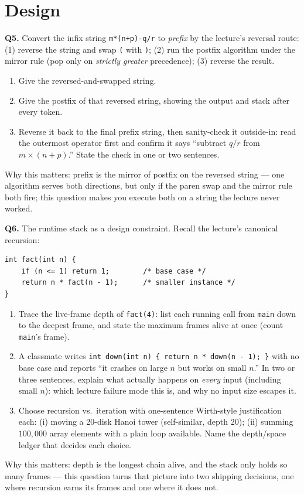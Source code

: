 \documentclass[11pt]{article}
\begin{document}
\section{Design}

\textbf{Q5.} Convert the infix string \texttt{m*(n+p)-q/r} to \emph{prefix} by the lecture's reversal route: (1) reverse the string and swap \texttt{(} with \texttt{)}; (2) run the postfix algorithm under the mirror rule (pop only on \emph{strictly greater} precedence); (3) reverse the result.
\begin{enumerate}
  \item[(a)] Give the reversed-and-swapped string.
  \item[(b)] Give the postfix of that reversed string, showing the output and stack after every token.
  \item[(c)] Reverse it back to the final prefix string, then sanity-check it outside-in: read the outermost operator first and confirm it says ``subtract $q/r$ from $m \times (n+p)$.'' State the check in one or two sentences.
\end{enumerate}
Why this matters: prefix is the mirror of postfix on the reversed string --- one algorithm serves both directions, but only if the paren swap and the mirror rule both fire; this question makes you execute both on a string the lecture never worked.

\textbf{Q6.} The runtime stack as a design constraint. Recall the lecture's canonical recursion:
\begin{verbatim}
int fact(int n) {
    if (n <= 1) return 1;        /* base case */
    return n * fact(n - 1);      /* smaller instance */
}
\end{verbatim}
\begin{enumerate}
  \item[(a)] Trace the live-frame depth of \texttt{fact(4)}: list each running call from \texttt{main} down to the deepest frame, and state the maximum frames alive at once (count \texttt{main}'s frame).
  \item[(b)] A classmate writes \texttt{int down(int n) \{ return n * down(n - 1); \}} with no base case and reports ``it crashes on large $n$ but works on small $n$.'' In two or three sentences, explain what actually happens on \emph{every} input (including small $n$): which lecture failure mode this is, and why no input size escapes it.
  \item[(c)] Choose recursion vs.\ iteration with one-sentence Wirth-style justification each: (i) moving a 20-disk Hanoi tower (self-similar, depth 20); (ii) summing $100{,}000$ array elements with a plain loop available. Name the depth/space ledger that decides each choice.
\end{enumerate}
Why this matters: depth is the longest chain alive, and the stack only holds so many frames --- this question turns that picture into two shipping decisions, one where recursion earns its frames and one where it does not.



\end{document}
